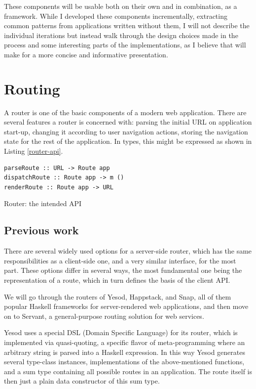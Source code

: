 \documentclass[english,zadani,odsaz]{fitthesis}
\begin{document}
These components will be usable both on their own and in combination, as a
framework. While I developed these components incrementally, extracting common
patterns from applications written without them, I will not describe the
individual iterations but instead walk through the design choices made in the
process and some interesting parts of the implementations, as I believe that
will make for a more concise and informative presentation.

\section{Routing}
\label{sec:orgf0e42c3}
A router is one of the basic components of a modern web application. There are
several features a router is concerned with: parsing the initial URL on
application start-up, changing it according to user navigation actions, storing
the navigation state for the rest of the application. In types, this might be
expressed as shown in Listing \ref{router-api}.

\begin{listing}[!bp]
\begin{verbatim}
parseRoute :: URL -> Route app
dispatchRoute :: Route app -> m ()
renderRoute :: Route app -> URL
\end{verbatim}
\caption{Router: the intended API \label{router-api}}
\end{listing}

\subsection{Previous work}
\label{sec:org2dbefc5}
There are several widely used options for a server-side router, which has the
same responsibilities as a client-side one, and a very similar interface, for
the most part. These options differ in several ways, the most fundamental one
being the representation of a route, which in turn defines the basis of the
client API.

We will go through the routers of Yesod, Happstack, and Snap, all of them
popular Haskell frameworks for server-rendered web applications, and then move
on to Servant, a general-purpose routing solution for web services.

Yesod uses a special DSL (Domain Specific Language) for its router, which is
implemented via quasi-quoting, a specific flavor of meta-programming where an
arbitrary string is parsed into a Haskell expression. In this way Yesod
generates several type-class instances, implementations of the above-mentioned
functions, and a sum type containing all possible routes in an application. The
route itself is then just a plain data constructor of this sum type.
\end{document}
